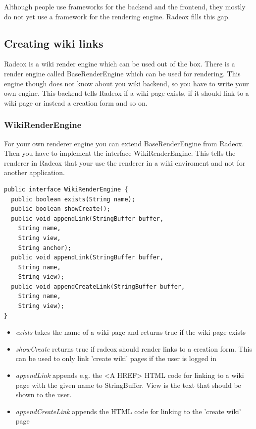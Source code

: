 \documentclass[a4paper,pdftex]{article}
\begin{document}
Although people use frameworks for the backend and the frontend, 
they mostly do not yet use a framework for the rendering engine. 
Radeox fills this gap.

\subsection{Creating wiki links}

Radeox is a wiki render engine which can be used out of the box. 
There is a render engine called BaseRenderEngine which can be used for rendering. 
This engine though does not know about you wiki backend, so you have to write your own engine. This backend
tells Radeox if a wiki page exists, if it should link to a wiki page or instead a creation form and so on.

\subsubsection{WikiRenderEngine}

For your own renderer engine you can extend BaseRenderEngine from Radeox. Then you have to implement the
interface WikiRenderEngine. This tells the renderer in Radeox that your use the renderer in a wiki enviroment and
not for another application.

\begin{verbatim}
public interface WikiRenderEngine {
  public boolean exists(String name);
  public boolean showCreate();
  public void appendLink(StringBuffer buffer, 
    String name, 
    String view, 
    String anchor);
  public void appendLink(StringBuffer buffer, 
    String name, 
    String view);
  public void appendCreateLink(StringBuffer buffer, 
    String name, 
    String view);
}
\end{verbatim}


\begin{itemize}
\item {\it exists} takes the name of a wiki page and returns true if the wiki page exists
\item {\it showCreate} returns true if radeox should render links to a creation form. This can be used to only link 'create wiki' pages if the user is logged in
\item {\it appendLink} appends e.g. the <A HREF> HTML code for linking to a wiki page with the given name to StringBuffer. View is the text that should be shown to the user.
\item {\it appendCreateLink} appends the HTML code for linking to the 'create wiki' page
\end{itemize}
\end{document}
